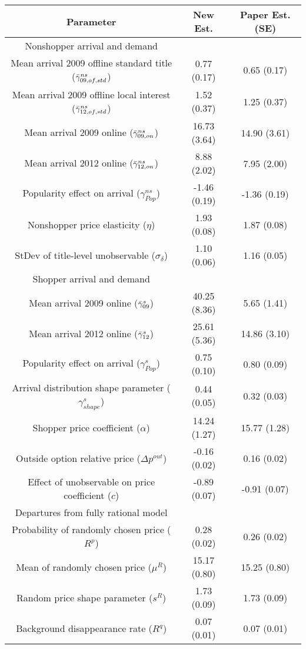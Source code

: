 \begin{table}[h]
\centering
\begin{tabular}{c|c|c}\toprule Parameter & New Est. & Paper Est. (SE)\\[2mm]\hline 
 Nonshopper arrival and demand  \\ 
 \hline
Mean arrival 2009 offline standard title ($\Bar{\gamma}^{ns}_{09,of,std}$) &  0.77 (0.17) & 0.65 (0.17)\\ 
 Mean arrival 2009 offline local interest ($\Bar{\gamma}^{ns}_{12,of,std}$) &  1.52 (0.37) & 1.25 (0.37)\\ 
 Mean arrival 2009 online ($\Bar{\gamma}^{ns}_{09,on}$) &  16.73 (3.64) & 14.90 (3.61)\\ 
 Mean arrival 2012 online ($\Bar{\gamma}^{ns}_{12,on}$) &  8.88 (2.02) & 7.95 (2.00)\\ 
 Popularity effect on arrival ($\gamma^{ns}_{Pop}$) &  -1.46 (0.19) & -1.36 (0.19)\\ 
 Nonshopper price elasticity ($\eta$) &  1.93 (0.08) & 1.87 (0.08)\\ 
 StDev of title-level unobservable ($\sigma_{\delta}$) &  1.10 (0.06) & 1.16 (0.05)\\ 
 \hline 
 Shopper arrival and demand  \\ 
 \hline
Mean arrival 2009 online ($\Bar{\gamma}^s_{09}$) &  40.25 (8.36) & 5.65 (1.41)\\ 
 Mean arrival 2012 online ($\Bar{\gamma}^s_{12}$) &  25.61 (5.36) & 14.86 (3.10)\\ 
 Popularity effect on arrival ($\gamma^{s}_{Pop}$) &  0.75 (0.10) & 0.80 (0.09)\\ 
 Arrival distribution shape parameter ($\gamma^s_{shape}$) &  0.44 (0.05) & 0.32 (0.03)\\ 
 Shopper price coefficient ($\alpha$) &  14.24 (1.27) & 15.77 (1.28)\\ 
 Outside option relative price ($\Delta p^{out}$) &  -0.16 (0.02) & 0.16 (0.02)\\ 
 Effect of unobservable on price coefficient ($c$) &  -0.89 (0.07) & -0.91 (0.07)\\ 
 \hline 
 Departures from fully rational model  \\ 
 \hline
Probability of randomly chosen price ($R^p$) &  0.28 (0.02) & 0.26 (0.02)\\ 
 Mean of randomly chosen price ($\mu^R$) &  15.17 (0.80) & 15.25 (0.80)\\ 
 Random price shape parameter ($s^R$) &  1.73 (0.09) & 1.73 (0.09)\\ 
 Background disappearance rate ($R^q$) &  0.07 (0.01) & 0.07 (0.01)\\ 
 \end{tabular}\label{tab:my_label}\end{table}